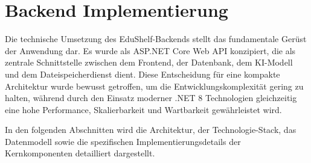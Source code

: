 \chapter{Backend Implementierung}
\phillipSeite

Die technische Umsetzung des EduShelf-Backends stellt das fundamentale Gerüst der Anwendung dar. Es wurde als ASP.NET Core Web API konzipiert, die als zentrale Schnittstelle zwischen dem Frontend, der Datenbank, dem KI-Modell und dem Dateispeicherdienst dient. Diese Entscheidung für eine kompakte Architektur wurde bewusst getroffen, um die Entwicklungskomplexität gering zu halten, während durch den Einsatz moderner .NET 8 Technologien gleichzeitig eine hohe Performance, Skalierbarkeit und Wartbarkeit gewährleistet wird.

In den folgenden Abschnitten wird die Architektur, der Technologie-Stack, das Datenmodell sowie die spezifischen Implementierungsdetails der Kernkomponenten detailliert dargestellt.















